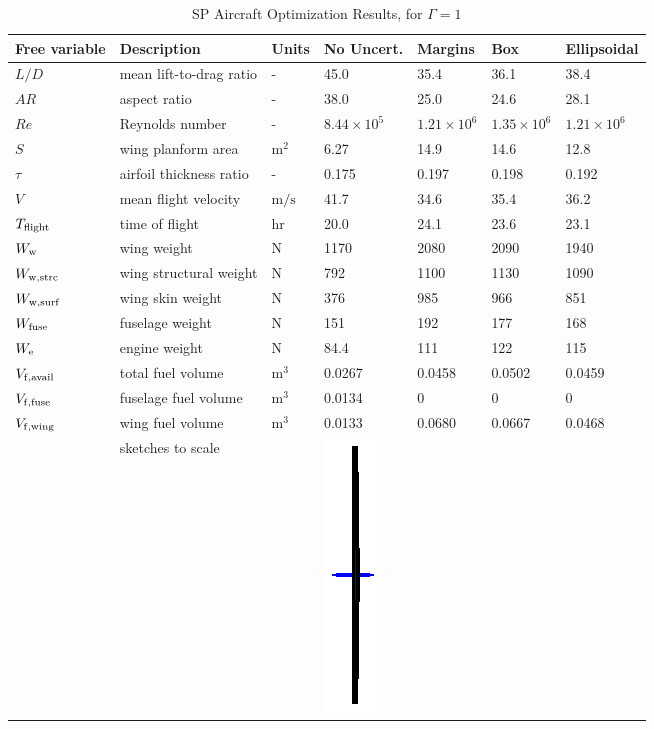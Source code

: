 \begin{table}[!h]
\begin{center}
\caption{\label{tab:results} SP Aircraft Optimization Results, for $\Gamma = 1$}
\begin{tabular}{C{2cm} C{3.8cm} C{1.25cm} C{1.6cm} C{1.6cm} C{1.6cm} C{1.6cm}}
\hline
Free variable & Description & Units & No Uncert. & Margins & Box & Ellipsoidal \\
\hline
$L/D$ & mean lift-to-drag ratio & - & 45.0 & 35.4 & 36.1 & 38.4 \\
$AR$ & aspect ratio & - & 38.0 & 25.0 & 24.6 & 28.1 \\
$Re$ & Reynolds number & - & $8.44 \times 10^5$ & $1.21 \times 10^6$ & $1.35\times 10^6$ & $1.21 \times 10^6$ \\
$S$ & wing planform area &$\mathrm{m^2}$ & 6.27 & 14.9 & 14.6 & 12.8 \\
$\tau$ & airfoil thickness ratio & - & 0.175 & 0.197 & 0.198 & 0.192 \\
$V$ & mean flight velocity &$\mathrm{m/s}$ & 41.7 & 34.6 & 35.4 & 36.2 \\
$T_{\rm{flight}}$ & time of flight & $\mathrm{hr}$ & 20.0 & 24.1 & 23.6 & 23.1 \\
$W_{\rm{w}}$ & wing weight & $\mathrm{N}$ & 1170 & 2080 & 2090 & 1940 \\
$W_{\rm{w,strc}}$ & wing structural weight &$\mathrm{N}$ & 792 & 1100 & 1130 & 1090 \\
$W_{\rm{w,surf}}$ & wing skin weight &$\mathrm{N}$ & 376 & 985 & 966 & 851 \\
$W_{\rm{fuse}}$ & fuselage weight &$\mathrm{N}$ & 151 & 192 & 177 & 168 \\
$W_{\rm{e}}$ & engine weight &$\mathrm{N}$ & 84.4 & 111 & 122 & 115 \\
$V_{\rm{f,avail}}$ & total fuel volume & $\mathrm{m^3}$ & 0.0267 & 0.0458 & 0.0502 & 0.0459 \\
$V_{\rm{f,fuse}}$ & fuselage fuel volume & $\mathrm{m^3}$ & 0.0134 & 0 & 0 & 0 \\
$V_{\rm{f,wing}}$ & wing fuel volume &$\mathrm{m^3}$ & 0.0133 & 0.0680 & 0.0667 & 0.0468    \\
& sketches to scale & &
    \includegraphics[trim={10.5cm 1.5cm 10.5cm 1.5cm},clip,scale=0.7]{nominal.eps} &

\end{tabular}
\end{center}
\end{table}
